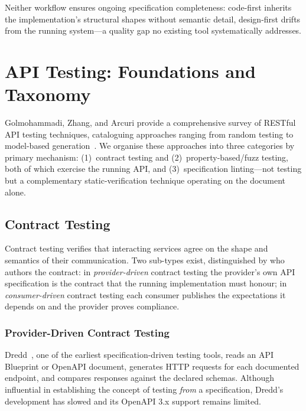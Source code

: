 Neither workflow ensures ongoing specification completeness: code-first inherits the implementation's structural shapes without semantic detail, design-first drifts from the running system---a quality gap no existing tool systematically addresses.

\section{API Testing: Foundations and Taxonomy}
\label{sec:api-testing-foundations}

Golmohammadi, Zhang, and Arcuri provide a comprehensive survey of RESTful API testing techniques, cataloguing approaches ranging from random testing to model-based generation~\cite{api-testing-survey}. We organise these approaches into three categories by primary mechanism: (1)~contract testing and (2)~property-based/fuzz testing, both of which exercise the running API, and (3)~specification linting---not testing but a complementary static-verification technique operating on the document alone.

\subsection{Contract Testing}
\label{subsec:contract-testing}

Contract testing verifies that interacting services agree on the shape and semantics of their communication. Two sub-types exist, distinguished by who authors the contract: in \textit{provider-driven} contract testing the provider's own API specification is the contract that the running implementation must honour; in \textit{consumer-driven} contract testing each consumer publishes the expectations it depends on and the provider proves compliance.

\subsubsection{Provider-Driven Contract Testing}
\label{subsec:dredd-and-beyond}

Dredd~\cite{dredd}, one of the earliest specification-driven testing tools, reads an API Blueprint or OpenAPI document, generates HTTP requests for each documented endpoint, and compares responses against the declared schemas. Although influential in establishing the concept of testing \textit{from} a specification, Dredd's development has slowed and its OpenAPI 3.x support remains limited.

